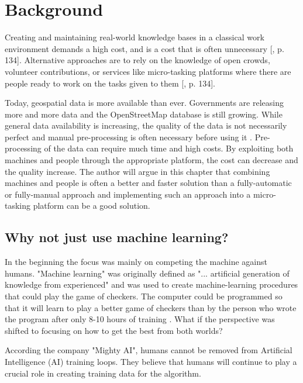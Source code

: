 \chapter{Background}

Creating and maintaining real-world knowledge bases in a classical work environment demands a high cost, and is a cost that is often unnecessary [\citep{Meier2013}, p. 134]. Alternative approaches are to rely on the knowledge of open crowds, volunteer contributions, or services like micro-tasking platforms where there are people ready to work on the tasks given to them [\citep{Meier2013}, p. 134].   

Today, geospatial data is more available than ever. Governments are releasing more and more data and the OpenStreetMap database is still growing. While general data availability is increasing, the quality of the data is not necessarily perfect and manual pre-processing is often necessary before using it \citep{Difallah2015}.  Pre-processing of the data can require much time and high costs. By exploiting both machines and people through the appropriate platform, the cost can decrease and the quality increase. The author will argue in this chapter that combining machines and people is often a better and faster solution than a fully-automatic or fully-manual approach and implementing such an approach into a micro-tasking platform can be a good solution. 

\section{Why not just use machine learning?}
In the beginning the focus was mainly on competing the machine against humans. "Machine learning" was originally defined as "... artificial generation of knowledge from experienced" and was used to create machine-learning procedures that could play the game of checkers. The computer could be programmed so that it will learn to play a better game of checkers than by the person who wrote the program after only 8-10 hours of training \citep{Samuel1959}. What if the perspective was shifted to focusing on how to get the best from both worlds? 

According the company "Mighty AI", humans cannot be removed from Artificial Intelligence (AI) training loops. They believe that humans will continue to play a crucial role in creating training data for the algorithm. %

